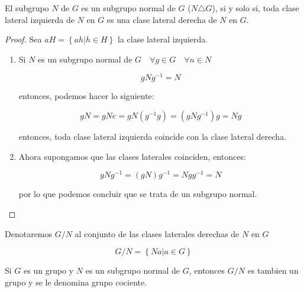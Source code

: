 	\begin{lema}
		El subgrupo $N$ de $G$ es un subgrupo normal de $G$ ($N \triangle G$), si y solo si, toda clase lateral izquierda de $N$ en $G$ es una clase lateral derecha de $N$ en $G$.
	\end{lema}

	\begin{proof}
		Sea $aH = \left\{ ah | h \in H \right\}$ la clase lateral izquierda.
		\begin{enumerate}[i]
			\item Si $N$ es un subgrupo normal de $G \quad \forall g \in G \quad \forall n \in N$
			
			\begin{equation}
				g N g^{-1} = N \nonumber
			\end{equation}

			entonces, podemos hacer lo siguiente:

			\begin{equation}
				g N = g N e = g N \left( g^{-1} g \right) = \left( g N g^{-1} \right) g = N g \nonumber
			\end{equation}

			entonces, toda clase lateral izquierda coincide con la clase lateral derecha.

			\item Ahora supongamos que las clases laterales coinciden, entonces:

			\begin{equation}
				g N g^{-1} = \left( g N \right) g^{-1} = N g g^{-1} = N \nonumber
			\end{equation}

			por lo que podemos concluir que se trata de un subgrupo normal.
		\end{enumerate}
	\end{proof}

	\begin{definicion}
		Denotaremos $G/N$ al conjunto de las clases laterales derechas de $N$ en $G$

		\begin{equation}
			G/N = \left\{ Na | a \in G \right\}
		\end{equation}
	\end{definicion}

	\begin{teorema}
		Si $G$ es un grupo y $N$ es un subgrupo normal de $G$, entonces $G/N$ es tambien un grupo y se le denomina grupo cociente.
	\end{teorema}

